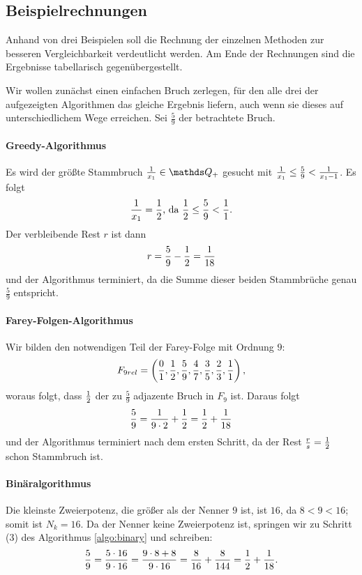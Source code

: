 \subsection{Beispielrechnungen}

Anhand von drei Beispielen soll die Rechnung der einzelnen Methoden zur besseren Vergleichbarkeit verdeutlicht werden. Am Ende der Rechnungen sind die Ergebnisse tabellarisch gegenübergestellt.

\begin{bsp}
	Wir wollen zunächst einen einfachen Bruch zerlegen, für den alle drei der aufgezeigten Algorithmen das gleiche Ergebnis liefern, auch wenn sie dieses auf unterschiedlichem Wege erreichen.
	Sei $\frac{5}{9}$ der betrachtete Bruch.
	\paragraph{Greedy-Algorithmus} Es wird der größte Stammbruch $\uf{x_1} \in \Q_+$ gesucht mit $\frac{1}{x_1} \leq \frac{5}{9} < \frac{1}{x_1-1}$. Es folgt $$\frac{1}{x_1} = \frac{1}{2} \text{, da }
	\frac{1}{2} \leq \frac{5}{9} < \frac{1}{1}.$$
	Der verbleibende Rest $r$ ist dann $$r = \frac{5}{9} - \frac{1}{2} = \frac{1}{18}$$
	und der Algorithmus terminiert, da die Summe dieser beiden Stammbrüche genau $\frac{5}{9}$ entspricht.
	
	\paragraph{Farey-Folgen-Algorithmus}Wir bilden den notwendigen Teil der Farey-Folge mit Ordnung $9$: $$F_{9rel} = \left( \frac{0}{1}, \frac{1}{2}, \frac{5}{9}, \frac{4}{7}, \frac{3}{5}, \frac{2}{3}, \frac{1}{1}\right),$$ woraus folgt, dass $\frac{1}{2}$ der zu $\frac{5}{9}$ adjazente Bruch in $F_9$ ist. Daraus folgt 
	$$\frac{5}{9} = \frac{1}{9 \cdot 2} + \frac{1}{2} = \frac{1}{2} + \frac{1}{18}$$ und der Algorithmus terminiert nach dem ersten Schritt, da der Rest $\frac{r}{s} = \frac{1}{2}$ schon Stammbruch ist.
	
	\paragraph{Binäralgorithmus}Die kleinste Zweierpotenz, die größer als der Nenner $9$ ist, ist $16$, da $8<9<16$; somit ist $N_k = 16$. Da der Nenner keine Zweierpotenz ist, springen wir zu Schritt (3) des Algorithmus \ref{algo:binary} und schreiben:
	$$\frac{5}{9} = \frac{5\cdot16}{9 \cdot 16} = \frac{9 \cdot 8 + 8}{9 \cdot 16} = \frac{8}{16} + \frac{8}{144} = \frac{1}{2} + \frac{1}{18}.$$
	

\end{bsp}

